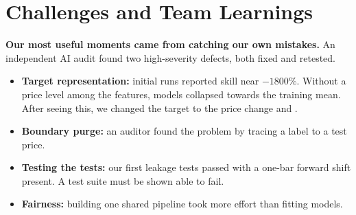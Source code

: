 \section{Challenges and Team Learnings}
\label{sec:learnings}

\textbf{Our most useful moments came from catching our own mistakes.} An
independent AI audit found two high-severity defects, both fixed and retested.

\begin{itemize}
  \item \textbf{Target representation:} initial runs reported skill near $-1800\%$.
  Without a price level among the features, models collapsed towards the training
  mean. After seeing this, we changed the target to the price change and
  .
  \item \textbf{Boundary purge:} an auditor found the problem by tracing a label to
  a test price.
  \item \textbf{Testing the tests:} our first leakage tests passed with a one-bar
  forward shift present. A test suite must be shown able to fail.
  \item \textbf{Fairness:} building one shared pipeline took more effort than
  fitting models.
\end{itemize}
